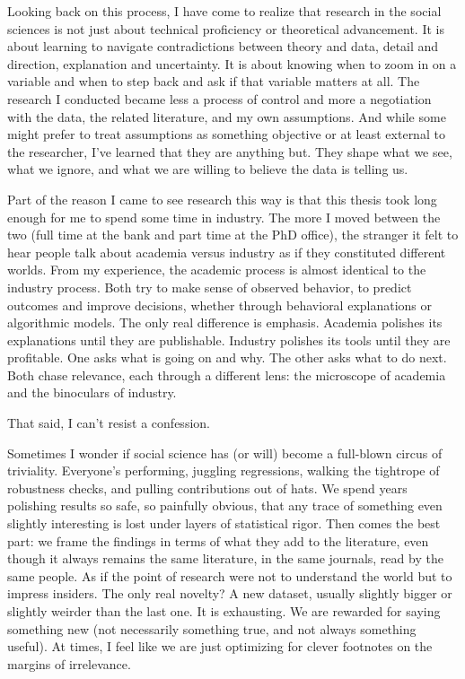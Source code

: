 Looking back on this process, I have come to realize that research in the social sciences is not just about technical proficiency or theoretical advancement. It is about learning to navigate contradictions between theory and data, detail and direction, explanation and uncertainty. It is about knowing when to zoom in on a variable and when to step back and ask if that variable matters at all. The research I conducted became less a process of control and more a negotiation with the data, the related literature, and my own assumptions. And while some might prefer to treat assumptions as something objective or at least external to the researcher, I’ve learned that they are anything but. They shape what we see, what we ignore, and what we are willing to believe the data is telling us.

Part of the reason I came to see research this way is that this thesis took long enough for me to spend some time in industry. The more I moved between the two (full time at the bank and part time at the PhD office), the stranger it felt to hear people talk about academia versus industry as if they constituted different worlds. From my experience, the academic process is almost identical to the industry process. Both try to make sense of observed behavior, to predict outcomes and improve decisions, whether through behavioral explanations or algorithmic models. The only real difference is emphasis. Academia polishes its explanations until they are publishable. Industry polishes its tools until they are profitable. One asks what is going on and why. The other asks what to do next. Both chase relevance, each through a different lens: the microscope of academia and the binoculars of industry.

That said, I can’t resist a confession.

Sometimes I wonder if social science has (or will) become a full-blown circus of triviality. Everyone’s performing, juggling regressions, walking the tightrope of robustness checks, and pulling contributions out of hats. We spend years polishing results so safe, so painfully obvious, that any trace of something even slightly interesting is lost under layers of statistical rigor. Then comes the best part: we frame the findings in terms of what they add to the literature, even though it always remains the same literature, in the same journals, read by the same people. As if the point of research were not to understand the world but to impress insiders. The only real novelty? A new dataset, usually slightly bigger or slightly weirder than the last one. It is exhausting. We are rewarded for saying something new (not necessarily something true, and not always something useful). At times, I feel like we are just optimizing for clever footnotes on the margins of irrelevance.

